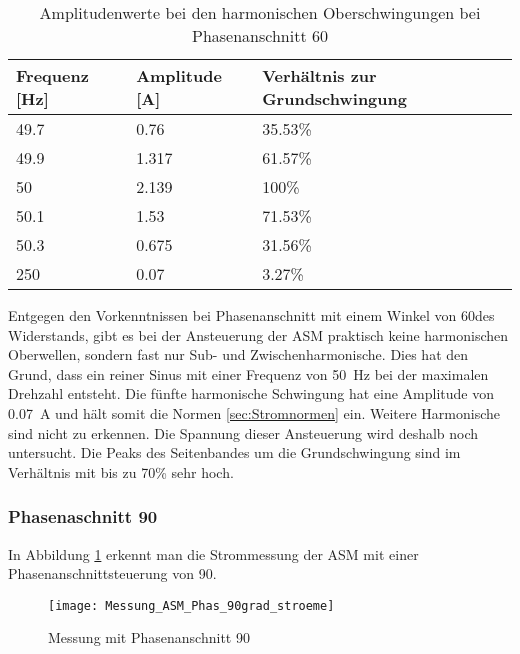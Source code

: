 \begin{table}[ht!]
	\centering
	\begin{tabular}{|l|l|l|}
		\hline
		Frequenz {[}Hz{]} & Amplitude {[}A{]} & Verhältnis zur Grundschwingung	\\ \hline
		49.7              & 0.76              & 35.53\%							\\ \hline
		49.9              & 1.317             & 61.57\%							\\ \hline
		50                & 2.139             & 100\%							\\ \hline
		50.1              & 1.53              & 71.53\%							\\ \hline
		50.3              & 0.675             & 31.56\%							\\ \hline
		250               & 0.07              & 3.27\%							\\ \hline
	\end{tabular}
	\caption{Amplitudenwerte bei den harmonischen Oberschwingungen bei Phasenanschnitt 60\textdegree}\label{tab:Phas_60_ASM_stroeme}
\end{table}
Entgegen den Vorkenntnissen bei Phasenanschnitt mit einem Winkel von 60\textdegree des Widerstands, gibt es bei der Ansteuerung der ASM praktisch keine harmonischen Oberwellen, sondern fast nur Sub- und Zwischenharmonische. Dies hat den Grund, dass ein reiner Sinus mit einer Frequenz von \SI{50}{Hz} bei der maximalen Drehzahl entsteht. Die fünfte harmonische Schwingung hat eine Amplitude von \SI{0.07}{A} und hält somit die Normen \ref{sec:Stromnormen} ein. Weitere Harmonische sind nicht zu erkennen. Die Spannung dieser Ansteuerung wird deshalb noch untersucht. Die Peaks des Seitenbandes um die Grundschwingung sind im Verhältnis mit bis zu 70\% sehr hoch. 


\subsubsection*{Phasenaschnitt 90\textdegree}

In Abbildung \ref{fig:Mess_Phas_90grad_stroeme} erkennt man die Strommessung der ASM mit einer Phasenanschnittsteuerung von 90\textdegree \hspace{0.02cm}.

\begin{figure}[ht!]
	\centering
	\texttt{[image: Messung\_ASM\_Phas\_90grad\_stroeme]}	
	\caption{Messung mit Phasenanschnitt 90\textdegree}\label{fig:Mess_Phas_90grad_stroeme}
\end{figure}


